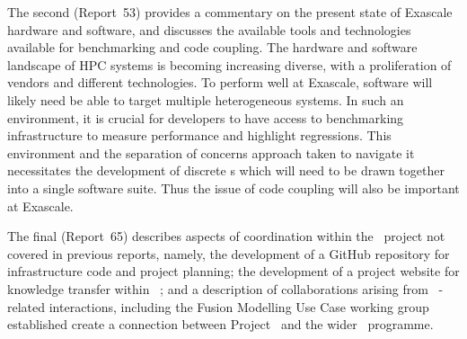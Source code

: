 The second (Report~53)  provides a commentary on the present state of Exascale hardware and software, and discusses the 
available tools and technologies available for benchmarking and code coupling. The hardware and software landscape of 
HPC systems is becoming increasing diverse, with a proliferation of vendors and different technologies. To perform well 
at Exascale, software will likely need be able to target multiple heterogeneous systems. In such an environment, it is 
crucial for developers to have access to benchmarking infrastructure to measure performance and highlight regressions. 
This environment  and the separation of concerns approach taken to navigate it  necessitates the development of 
discrete \papp s which will need to be drawn together into a single software suite. Thus the issue of code coupling 
will also be important at Exascale.

The final (Report~65)  describes aspects of coordination within the \nep \   project not covered in previous reports, namely, 
the development of a GitHub repository for infrastructure code and project planning; the development of a project 
website for knowledge transfer within \nep \  ; and a description of collaborations arising from \nep \  -related 
interactions, including the Fusion Modelling Use Case working group established create a connection between Project 
\nep \   and the wider \exc \   programme.
